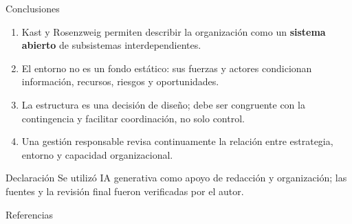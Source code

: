 \documentclass[spanish,aspectratio=169,xcolor={dvipsnames,table}]{beamer}
\newcommand{\clave}[1]{\textcolor{itescaRedDark}{\textbf{#1}}}
\begin{document}
\begin{frame}{Conclusiones}
\begin{enumerate}\item Kast y Rosenzweig permiten describir la organización como un \clave{sistema abierto} de subsistemas interdependientes.
\item El entorno no es un fondo estático: sus fuerzas y actores condicionan información, recursos, riesgos y oportunidades.
\item La estructura es una decisión de diseño; debe ser congruente con la contingencia y facilitar coordinación, no solo control.
\item Una gestión responsable revisa continuamente la relación entre estrategia, entorno y capacidad organizacional.
\end{enumerate}
\vspace{.3cm}\begin{alertblock}{Declaración} Se utilizó IA generativa como apoyo de redacción y organización; las fuentes y la revisión final fueron verificadas por el autor.\end{alertblock}
\end{frame}

\begin{frame}{Referencias}
\footnotesize
\end{frame}
\end{document}
